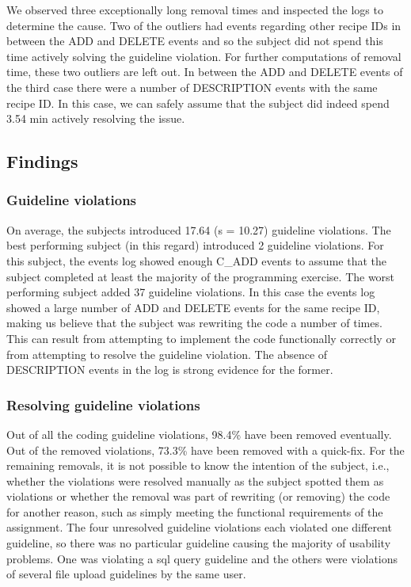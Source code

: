 We observed three exceptionally long removal times and inspected the logs to determine the cause.
Two of the outliers had events regarding other recipe IDs in between the ADD and DELETE events and so the subject did not spend this time actively solving the guideline violation.
For further computations of removal time, these two outliers are left out.
In between the ADD and DELETE events of the third case there were a number of DESCRIPTION events with the same recipe ID. In this case, we can safely assume that the subject did indeed spend 3.54 min actively resolving the issue.

\subsection{Findings}
\subsubsection{Guideline violations}
On average, the subjects introduced 17.64 (s = 10.27) guideline violations.
The best performing subject (in this regard) introduced 2 guideline violations.
For this subject, the events log showed enough C\_ADD events to assume that the subject completed at least the majority of the programming exercise.
The worst performing subject added 37 guideline violations.
In this case the events log showed a large number of ADD and DELETE events for the same recipe ID, making us believe that the subject was rewriting the code a number of times.
This can result from attempting to implement the code functionally correctly or from attempting to resolve the guideline violation.
The absence of DESCRIPTION events in the log is strong evidence for the former. 

\subsubsection{Resolving guideline violations}
Out of all the coding guideline violations, 98.4\% have been removed eventually.
Out of the removed violations, 73.3\% have been removed with a quick-fix.
For the remaining removals, it is not possible to know the intention of the subject, i.e., whether the violations were resolved manually as the subject spotted them as violations or whether the removal was part of rewriting (or removing) the code for another reason, such as simply meeting the functional requirements of the assignment.
The four unresolved guideline violations each violated one different guideline, so there was no particular guideline causing the majority of usability problems.
One was violating a \gls{sql} query guideline and the others were violations of several file upload guidelines by the same user.

